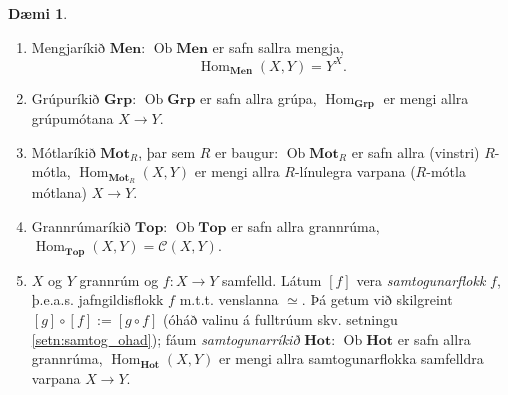 \documentclass[a4paper,icelandic]{book}
\theoremstyle{definition}
\newtheorem{daemi}{Dæmi}[section]
\theoremstyle{plain}
\theoremstyle{remark}
\DeclareMathOperator{\Ob}{Ob}
\DeclareMathOperator{\Hom}{Hom}
\begin{document}
\begin{daemi}
  \begin{enumerate}[(1)]
    \item Mengjaríkið $\mathbf{Men}$: $\Ob\mathbf{Men}$ er safn
      sallra mengja, \[\Hom_{\mathbf{Men}}(X,Y) = Y^X.\]
    \item Grúpuríkið $\mathbf{Grp}$: $\Ob\mathbf{Grp}$ er safn allra
      grúpa, $\Hom_{\mathbf{Grp}}$ er mengi allra grúpumótana $X\to Y$.
    \item Mótlaríkið $\mathbf{Mot}_R$, þar sem $R$ er baugur:
      $\Ob\mathbf{Mot}_R$ er safn allra (vinstri) $R$-mótla,
      $\Hom_{\mathbf{Mot}_R}(X,Y)$ er mengi allra $R$-línulegra varpana
      ($R$-mótla mótlana) $X\to Y$. 
    \item Grannrúmaríkið $\mathbf{Top}$: $\Ob\mathbf{Top}$ er safn allra
      grannrúma, $\Hom_{\mathbf{Top}}(X,Y)=\mathcal C(X,Y)$. 
    \item $X$ og $Y$ grannrúm og $f:X\to Y$ samfelld. Látum $[f]$ vera
      \emph{samtogunarflokk} $f$, þ.e.a.s.
      jafngildisflokk $f$ m.t.t. venslanna $\simeq$. Þá getum við
      skilgreint $[g]\circ[f] := [g\circ f]$ (óháð valinu á fulltrúum
      skv. setningu \ref{setn:samtog_ohad}); fáum
      \emph{samtogunarríkið} $\mathbf{Hot}$:
      $\Ob\mathbf{Hot}$ er safn allra grannrúma,
      $\Hom_{\mathbf{Hot}}(X,Y)$ er mengi allra samtogunarflokka
      samfelldra varpana $X\to Y$. 
  \end{enumerate}
\end{daemi}
\end{document}
